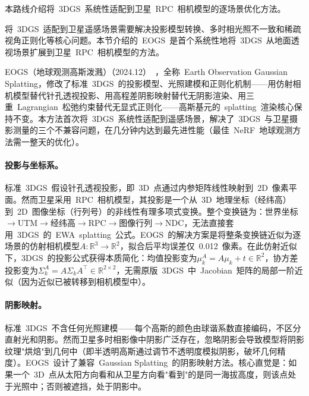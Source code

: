 本路线介绍将~3DGS~系统性适配到卫星~RPC~相机模型的逐场景优化方法。

将~3DGS~适配到卫星遥感场景需要解决投影模型转换、多时相光照不一致和稀疏视角正则化等核心问题。本节介绍的~EOGS~是首个系统性地将~3DGS~从地面透视场景扩展到卫星~RPC~相机模型的方法。

EOGS（地球观测高斯泼溅）（2024.12）~\cite{2412_13047}，全称~Earth Observation Gaussian Splatting，修改了标准~3DGS~的投影模型、光照建模和正则化机制——用仿射相机模型替代针孔透视投影、用高程差阴影映射替代无阴影渲染、用三重~Lagrangian~松弛约束替代无显式正则化——高斯基元的~splatting~渲染核心保持不变。本方法首次将~3DGS~系统性适配到遥感场景，解决了~3DGS~与卫星摄影测量的三个不兼容问题，在几分钟内达到最先进性能（最佳~NeRF~地球观测方法需一整天的优化）。

\paragraph{投影与坐标系。}标准~3DGS~假设针孔透视投影，即~3D~点通过内参矩阵线性映射到~2D~像素平面。然而卫星采用~RPC~相机模型，其投影是一个从~3D~地理坐标（经纬高）到~2D~图像坐标（行列号）的非线性有理多项式变换。整个变换链为：世界坐标$\to$UTM$\to$经纬高$\to$RPC$\to$图像行列$\to$NDC，无法直接套用~3DGS~的~EWA~splatting~公式。EOGS~的解决方案是将整条变换链近似为逐场景的仿射相机模型$A:\mathbb{R}^3 \to \mathbb{R}^2$，拟合后平均误差仅~0.012~像素。在此仿射近似下，3DGS~的投影公式获得本质简化：均值投影变为$\mu^A_k = A\mu_k + t \in \mathbb{R}^2$，协方差投影变为$\Sigma^A_k = A\Sigma_k A^\top \in \mathbb{R}^{2\times2}$，无需原版~3DGS~中~Jacobian~矩阵的局部一阶近似（因为近似已被转移到相机模型中）。

\paragraph{阴影映射。}标准~3DGS~不含任何光照建模——每个高斯的颜色由球谐系数直接编码，不区分直射光和阴影。然而卫星多时相影像中阴影广泛存在，忽略阴影会导致模型将阴影纹理"烘焙"到几何中（即半透明高斯通过调节不透明度模拟阴影，破坏几何精度）。EOGS~设计了兼容~Gaussian Splatting~的阴影映射方法。核心直觉是：如果一个~3D~点从太阳方向看和从卫星方向看"看到"的是同一海拔高度，则该点处于光照中；否则被遮挡，处于阴影中。

